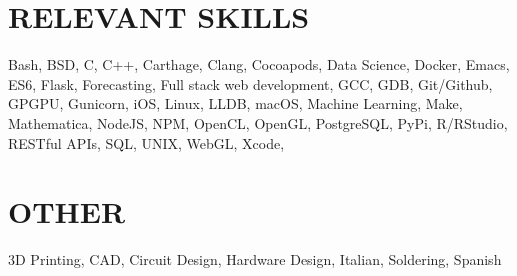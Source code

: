 \documentclass[margin]{../res}
\begin{document}
\begin{resume}
  \section{RELEVANT SKILLS}
Bash, BSD, C, C++, Carthage, Clang, Cocoapods, Data Science, Docker, Emacs,
ES6, Flask, Forecasting,
Full stack web development, GCC, GDB, Git/Github, GPGPU, Gunicorn, iOS, Linux, LLDB,
macOS, Machine
Learning, Make, Mathematica, NodeJS, NPM, OpenCL, OpenGL, PostgreSQL,
PyPi, R/RStudio, RESTful APIs, SQL, UNIX, WebGL, Xcode,

  \section{OTHER}
  3D Printing, CAD, Circuit Design, Hardware Design, Italian, Soldering, Spanish
 
\end{resume}
\end{document}
